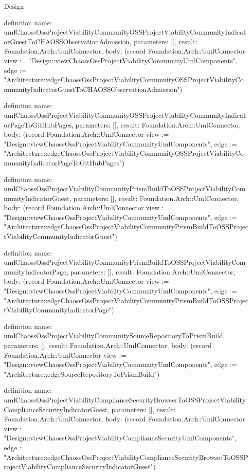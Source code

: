 \begin{lexlean}{Design}
\begin{semanticmodule}
definition{
  name: umlChaossOssProjectViabilityCommunityOSSProjectViabilityCommunityIndicatorGuestToCHAOSSObservationAdmission,
  parameters: [],
  result: Foundation.Arch::UmlConnector,
  body: (record Foundation.Arch::UmlConnector {view := "Design::viewChaossOssProjectViabilityCommunityUmlComponents", edge := "Architecture::edgeChaossOssProjectViabilityCommunityOSSProjectViabilityCommunityIndicatorGuestToCHAOSSObservationAdmission"})
}

definition{
  name: umlChaossOssProjectViabilityCommunityOSSProjectViabilityCommunityIndicatorPageToGitHubPages,
  parameters: [],
  result: Foundation.Arch::UmlConnector,
  body: (record Foundation.Arch::UmlConnector {view := "Design::viewChaossOssProjectViabilityCommunityUmlComponents", edge := "Architecture::edgeChaossOssProjectViabilityCommunityOSSProjectViabilityCommunityIndicatorPageToGitHubPages"})
}

definition{
  name: umlChaossOssProjectViabilityCommunityPrismBuildToOSSProjectViabilityCommunityIndicatorGuest,
  parameters: [],
  result: Foundation.Arch::UmlConnector,
  body: (record Foundation.Arch::UmlConnector {view := "Design::viewChaossOssProjectViabilityCommunityUmlComponents", edge := "Architecture::edgeChaossOssProjectViabilityCommunityPrismBuildToOSSProjectViabilityCommunityIndicatorGuest"})
}

definition{
  name: umlChaossOssProjectViabilityCommunityPrismBuildToOSSProjectViabilityCommunityIndicatorPage,
  parameters: [],
  result: Foundation.Arch::UmlConnector,
  body: (record Foundation.Arch::UmlConnector {view := "Design::viewChaossOssProjectViabilityCommunityUmlComponents", edge := "Architecture::edgeChaossOssProjectViabilityCommunityPrismBuildToOSSProjectViabilityCommunityIndicatorPage"})
}

definition{
  name: umlChaossOssProjectViabilityCommunitySourceRepositoryToPrismBuild,
  parameters: [],
  result: Foundation.Arch::UmlConnector,
  body: (record Foundation.Arch::UmlConnector {view := "Design::viewChaossOssProjectViabilityCommunityUmlComponents", edge := "Architecture::edgeSourceRepositoryToPrismBuild"})
}

definition{
  name: umlChaossOssProjectViabilityComplianceSecurityBrowserToOSSProjectViabilityComplianceSecurityIndicatorGuest,
  parameters: [],
  result: Foundation.Arch::UmlConnector,
  body: (record Foundation.Arch::UmlConnector {view := "Design::viewChaossOssProjectViabilityComplianceSecurityUmlComponents", edge := "Architecture::edgeChaossOssProjectViabilityComplianceSecurityBrowserToOSSProjectViabilityComplianceSecurityIndicatorGuest"})
}


\end{semanticmodule}
\end{lexlean}
